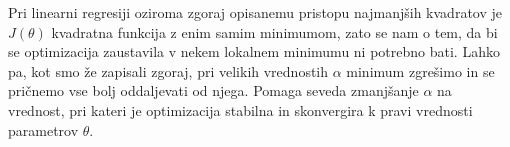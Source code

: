 Pri linearni regresiji oziroma zgoraj opisanemu pristopu najmanjših kvadratov je $J(\theta)$ kvadratna funkcija z enim samim minimumom, zato se nam o tem, da bi se optimizacija zaustavila v nekem lokalnem minimumu ni potrebno bati. Lahko pa, kot smo že zapisali zgoraj, pri velikih vrednostih $\alpha$ minimum zgrešimo in se pričnemo vse bolj oddaljevati od njega. Pomaga seveda zmanjšanje $\alpha$ na vrednost, pri kateri je optimizacija stabilna in skonvergira k pravi vrednosti parametrov $\theta$.
